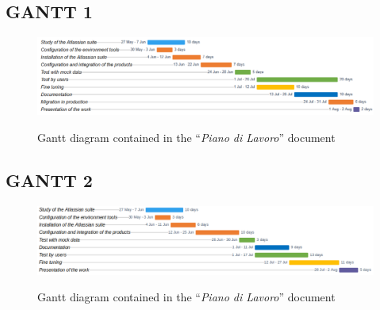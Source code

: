 \begin{landscape}
	\vspace*{\fill}
	\section{GANTT 1}
	\label{gantt_1}
	\begin{figure}[H]
		\centering
		\includegraphics[width=22cm]{resources/work_plan_gantt}\\
		\caption{Gantt diagram contained in the ``\textit{Piano di Lavoro}'' document}
	\end{figure}
	\vspace*{\fill}
\end{landscape}
\newpage
\begin{landscape}
	\vspace*{\fill}
	\section{GANTT 2}
	\label{gantt_2}
	\begin{figure}[H]
		\centering
		\includegraphics[width=22cm]{resources/revised_gantt}\\
		\caption{Gantt diagram contained in the ``\textit{Piano di Lavoro}'' document}
	\end{figure}
	\vspace*{\fill}
\end{landscape}